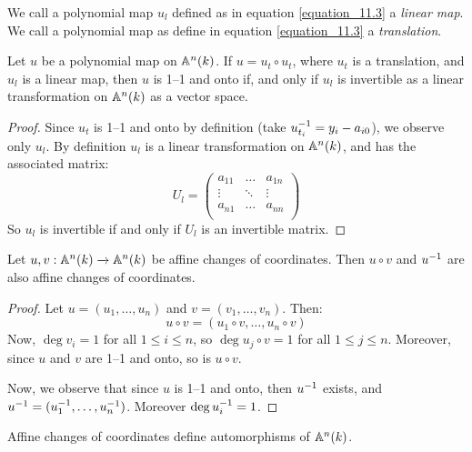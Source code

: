 \begin{definition}
  We call a polynomial map $u_l$ defined as in equation
  \ref{equation_11.3} a \textit{linear map}. We call a polynomial
  map as define in equation \ref{equation_11.3} a
  \textit{translation}.
\end{definition}

\begin{proposition}\label{equation_11.2.4}
  Let $u$ be a polynomial map on $\mathbb{A}^n(k)$. If $u=u_t \circ u_t$,
  where $u_t$ is a translation, and $u_l$ is a linear map, then $u$
  is 1--1 and onto if, and only if $u_l$ is invertible as a linear
  transformation on  $\mathbb{A}^n(k)$ as a vector space.
\end{proposition}
\begin{proof}
  Since $u_t$ is 1--1 and onto by definition (take
  $u_{t_i}^{-1}=y_i-a_{i0}$), we observe only $u_l$. By definition
  $u_l$ is a linear transformation on $\mathbb{A}^n(k)$, and has the
  associated matrix:
  \begin{equation*}
    U_l=
    \begin{pmatrix}
      a_{11} & \dots &  a_{1n}  \\
      \vdots  & \ddots  & \vdots  \\
      a_{n1} & \dots &  a_{nn}  \\
    \end{pmatrix}
  \end{equation*}
  So $u_l$ is invertible if and only if $U_l$ is an invertible
  matrix.
\end{proof}

\begin{proposition}\label{proposition_11.2.5}
  Let $u,v:\mathbb{A}^n(k) \xrightarrow{} \mathbb{A}^n(k)$ be affine changes of
  coordinates. Then $u \circ v$ and $u^{-1}$ are also affine
  changes of coordinates.
\end{proposition}
\begin{proof}
  Let $u=(u_1, \dots, u_n)$ and $v=(v_1, \dots, v_n)$. Then:
  \begin{equation*}
    u \circ v=(u_1 \circ v, \dots, u_n \circ v)
  \end{equation*}
  Now, $\deg{v_i}=1$ for all $1 \leq i \leq n$, so $\deg{u_j \circ
  v}=1$ for all $1 \leq j \leq n$. Moreover, since $u$ and $v$ are
  1--1 and onto, so is $u \circ v$.

  Now, we observe that since $u$ is 1--1 and onto, then $u^{-1}$
  exists, and $u^{-1}=(u_1^{-1}, \dots, u_n^{-1})$. Moreover
  $\deg{u_i^{-1}}=1$.
\end{proof}
\begin{corollary}
  Affine changes of coordinates define automorphisms of $\mathbb{A}^n(k)$.
\end{corollary}
